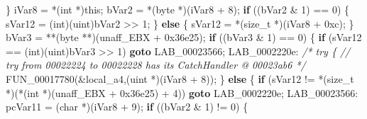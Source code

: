 \documentclass[
]{article}
\newenvironment{Shaded}{}{}
\newcommand{\BaseNTok}[1]{\textcolor[rgb]{0.25,0.63,0.44}{#1}}
\newcommand{\CommentTok}[1]{\textcolor[rgb]{0.38,0.63,0.69}{\textit{#1}}}
\newcommand{\ControlFlowTok}[1]{\textcolor[rgb]{0.00,0.44,0.13}{\textbf{#1}}}
\newcommand{\DataTypeTok}[1]{\textcolor[rgb]{0.56,0.13,0.00}{#1}}
\newcommand{\DecValTok}[1]{\textcolor[rgb]{0.25,0.63,0.44}{#1}}
\newcommand{\NormalTok}[1]{#1}
\newcommand{\OperatorTok}[1]{\textcolor[rgb]{0.40,0.40,0.40}{#1}}
\begin{document}
\begin{Shaded}
\begin{Highlighting}[]
  \OperatorTok{\}}
\NormalTok{  iVar8 }\OperatorTok{=} \OperatorTok{*(}\DataTypeTok{int} \OperatorTok{*)}\NormalTok{this}\OperatorTok{;}
\NormalTok{  bVar2 }\OperatorTok{=} \OperatorTok{*(}\NormalTok{byte }\OperatorTok{*)(}\NormalTok{iVar8 }\OperatorTok{+} \DecValTok{8}\OperatorTok{);}
  \ControlFlowTok{if} \OperatorTok{((}\NormalTok{bVar2 }\OperatorTok{\&} \DecValTok{1}\OperatorTok{)} \OperatorTok{==} \DecValTok{0}\OperatorTok{)} \OperatorTok{\{}
\NormalTok{    sVar12 }\OperatorTok{=} \OperatorTok{(}\DataTypeTok{int}\OperatorTok{)(}\NormalTok{uint}\OperatorTok{)}\NormalTok{bVar2 }\OperatorTok{\textgreater{}\textgreater{}} \DecValTok{1}\OperatorTok{;}
  \OperatorTok{\}}
  \ControlFlowTok{else} \OperatorTok{\{}
\NormalTok{    sVar12 }\OperatorTok{=} \OperatorTok{*(}\DataTypeTok{size\_t} \OperatorTok{*)(}\NormalTok{iVar8 }\OperatorTok{+} \BaseNTok{0xc}\OperatorTok{);}
  \OperatorTok{\}}
\NormalTok{  bVar3 }\OperatorTok{=} \OperatorTok{**(}\NormalTok{byte }\OperatorTok{**)(}\NormalTok{unaff\_EBX }\OperatorTok{+} \BaseNTok{0x36e25}\OperatorTok{);}
  \ControlFlowTok{if} \OperatorTok{((}\NormalTok{bVar3 }\OperatorTok{\&} \DecValTok{1}\OperatorTok{)} \OperatorTok{==} \DecValTok{0}\OperatorTok{)} \OperatorTok{\{}
    \ControlFlowTok{if} \OperatorTok{(}\NormalTok{sVar12 }\OperatorTok{==} \OperatorTok{(}\DataTypeTok{int}\OperatorTok{)(}\NormalTok{uint}\OperatorTok{)}\NormalTok{bVar3 }\OperatorTok{\textgreater{}\textgreater{}} \DecValTok{1}\OperatorTok{)} \ControlFlowTok{goto}\NormalTok{ LAB\_00023566}\OperatorTok{;}
\NormalTok{LAB\_0002220e}\OperatorTok{:}
                    \CommentTok{/* try \{ // try from 00022224 to 00022228 has its CatchHandler @ 00023ab6 */}
\NormalTok{    FUN\_00017780}\OperatorTok{(\&}\NormalTok{local\_a4}\OperatorTok{,(}\NormalTok{uint }\OperatorTok{*)(}\NormalTok{iVar8 }\OperatorTok{+} \DecValTok{8}\OperatorTok{));}
  \OperatorTok{\}}
  \ControlFlowTok{else} \OperatorTok{\{}
    \ControlFlowTok{if} \OperatorTok{(}\NormalTok{sVar12 }\OperatorTok{!=} \OperatorTok{*(}\DataTypeTok{size\_t} \OperatorTok{*)(*(}\DataTypeTok{int} \OperatorTok{*)(}\NormalTok{unaff\_EBX }\OperatorTok{+} \BaseNTok{0x36e25}\OperatorTok{)} \OperatorTok{+} \DecValTok{4}\OperatorTok{))} \ControlFlowTok{goto}\NormalTok{ LAB\_0002220e}\OperatorTok{;}
\NormalTok{LAB\_00023566}\OperatorTok{:}
\NormalTok{    pcVar11 }\OperatorTok{=} \OperatorTok{(}\DataTypeTok{char} \OperatorTok{*)(}\NormalTok{iVar8 }\OperatorTok{+} \DecValTok{9}\OperatorTok{);}
    \ControlFlowTok{if} \OperatorTok{((}\NormalTok{bVar2 }\OperatorTok{\&} \DecValTok{1}\OperatorTok{)} \OperatorTok{!=} \DecValTok{0}\OperatorTok{)} \OperatorTok{\{}

\end{Highlighting}
\end{Shaded}
\end{document}
